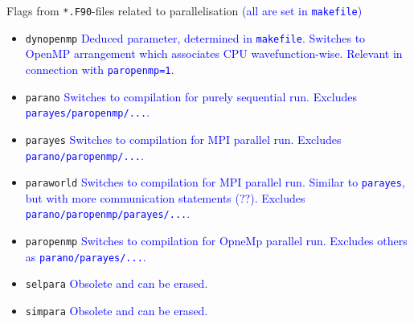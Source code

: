 \documentclass[11pt]{article}
\newcommand{\PGR}[1]{\textcolor{blue}{#1}}
\begin{document}
			Flags from \texttt{*.F90}-files related to
                        parallelisation \PGR{(all are set in {\tt makefile})}
			\begin{itemize}
				\item \texttt{dynopenmp}
                                   \PGR{Deduced parameter, determined
                                     in {\tt makefile}. Switches to
                                     OpenMP arrangement which
                                     associates CPU
                                     wavefunction-wise. Relevant in
                                     connection with
                                    \texttt{paropenmp=1}.}
				\item \texttt{parano}
                                   \PGR{Switches to compilation for
                                     purely sequential run.
                                  Excludes \texttt{parayes/paropenmp/...}.}
				\item \texttt{parayes}
                                   \PGR{Switches to compilation for
                                     MPI parallel run.
                                  Excludes \texttt{parano/paropenmp/...}.}
				\item \texttt{paraworld}
                                   \PGR{Switches to compilation for
                                     MPI parallel run. Similar to
                                     \texttt{parayes}, but with more
                                     communication statements (??).
                                  Excludes
                                  \texttt{parano/paropenmp/parayes/...}.} 
				\item \texttt{paropenmp}	
                                   \PGR{Switches to compilation for
                                     OpneMp parallel run.
                                  Excludes others as
                                  \texttt{parano/parayes/...}.} 
				\item \texttt{selpara}
                                   \PGR{Obsolete and can be erased.}
				\item \texttt{simpara}		
                                   \PGR{Obsolete and can be erased.}
			\end{itemize}
\end{document}
